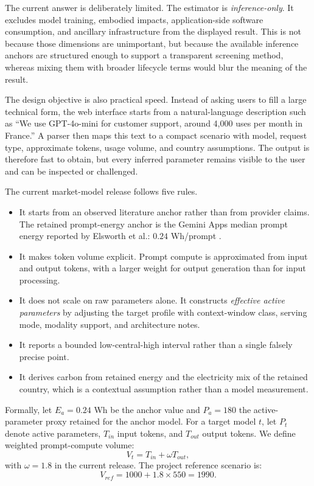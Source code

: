 \documentclass[10pt,a4paper]{article}
\begin{document}
The current answer is deliberately limited. The estimator is \emph{inference-only}. It excludes model training, embodied impacts, application-side software consumption, and ancillary infrastructure from the displayed result. This is not because those dimensions are unimportant, but because the available inference anchors are structured enough to support a transparent screening method, whereas mixing them with broader lifecycle terms would blur the meaning of the result.

The design objective is also practical speed. Instead of asking users to fill a large technical form, the web interface starts from a natural-language description such as ``We use GPT-4o-mini for customer support, around 4{,}000 uses per month in France.'' A parser then maps this text to a compact scenario with model, request type, approximate tokens, usage volume, and country assumptions. The output is therefore fast to obtain, but every inferred parameter remains visible to the user and can be inspected or challenged.

The current market-model release follows five rules.
\begin{itemize}
\item It starts from an observed literature anchor rather than from provider claims. The retained prompt-energy anchor is the Gemini Apps median prompt energy reported by Elsworth et al.: $0.24$ Wh/prompt \cite{elsworth2025}.
\item It makes token volume explicit. Prompt compute is approximated from input and output tokens, with a larger weight for output generation than for input processing.
\item It does not scale on raw parameters alone. It constructs \emph{effective active parameters} by adjusting the target profile with context-window class, serving mode, modality support, and architecture notes.
\item It reports a bounded low-central-high interval rather than a single falsely precise point.
\item It derives carbon from retained energy and the electricity mix of the retained country, which is a contextual assumption rather than a model measurement.
\end{itemize}

Formally, let $E_a = 0.24$ Wh be the anchor value and $P_a = 180$ the active-parameter proxy retained for the anchor model. For a target model $t$, let $P_t$ denote active parameters, $T_{in}$ input tokens, and $T_{out}$ output tokens. We define weighted prompt-compute volume:
\begin{equation}
V_t = T_{in} + \omega T_{out},
\end{equation}
with $\omega = 1.8$ in the current release. The project reference scenario is:
\begin{equation}
V_{ref} = 1000 + 1.8 \times 550 = 1990.
\end{equation}
\end{document}
